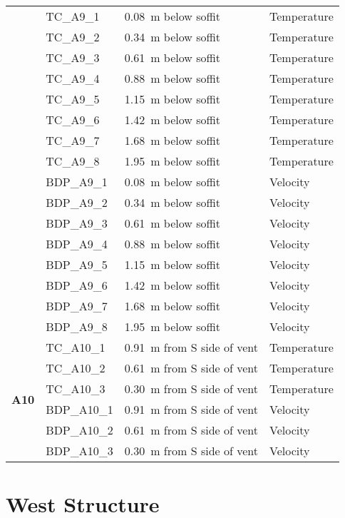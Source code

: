 \begin{longtable}[c]{c|lll}
 & TC\_A9\_1  & 0.08~m below soffit  & Temperature \\
 & TC\_A9\_2  & 0.34~m below soffit  & Temperature \\
 & TC\_A9\_3  & 0.61~m below soffit  & Temperature \\
 & TC\_A9\_4  & 0.88~m below soffit  & Temperature \\
 & TC\_A9\_5  & 1.15~m below soffit  & Temperature \\
 & TC\_A9\_6  & 1.42~m below soffit  & Temperature \\
 & TC\_A9\_7  & 1.68~m below soffit  & Temperature \\
 & TC\_A9\_8  & 1.95~m below soffit  & Temperature \\
\cline{2-4}
 & BDP\_A9\_1 & 0.08~m below soffit  & Velocity \\
 & BDP\_A9\_2 & 0.34~m below soffit  & Velocity \\
 & BDP\_A9\_3 & 0.61~m below soffit  & Velocity \\
 & BDP\_A9\_4 & 0.88~m below soffit  & Velocity \\
 & BDP\_A9\_5 & 1.15~m below soffit  & Velocity \\
 & BDP\_A9\_6 & 1.42~m below soffit  & Velocity \\
 & BDP\_A9\_7 & 1.68~m below soffit  & Velocity \\
 & BDP\_A9\_8 & 1.95~m below soffit  & Velocity \\
\midrule
\multirow{6}{*}{\large{\textbf{A10}}}
 & TC\_A10\_1 & 0.91~m from S side of vent & Temperature \\
 & TC\_A10\_2 & 0.61~m from S side of vent & Temperature \\
 & TC\_A10\_3 & 0.30~m from S side of vent & Temperature \\
\cline{2-4}
 & BDP\_A10\_1 & 0.91~m from S side of vent & Velocity \\
 & BDP\_A10\_2 & 0.61~m from S side of vent & Velocity \\
 & BDP\_A10\_3 & 0.30~m from S side of vent & Velocity \\
\bottomrule
\end{longtable}
\clearpage
\renewcommand{\baselinestretch}{2}
\small\normalsize

\section{West Structure}

